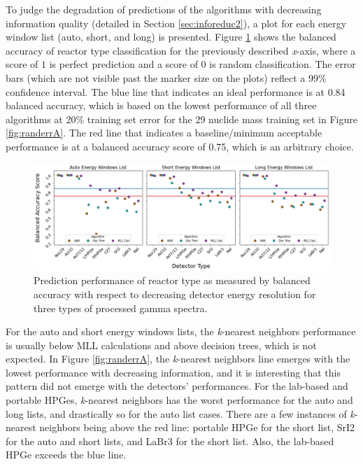 
To judge the degradation of predictions of the algorithms with decreasing
information quality (detailed in Section \ref{sec:inforeduc2}), a plot for each
energy window list (auto, short, and long) is presented.  Figure \ref{fig:rxtr}
shows the balanced accuracy of reactor type classification for the previously
described \textit{x}-axis, where a score of $1$ is perfect prediction and a
score of $0$ is random classification. The error bars (which are not visible
past the marker size on the plots) reflect a 99\% confidence interval.  The
blue line that indicates an ideal performance is at 0.84 balanced accuracy,
which is based on the lowest performance of all three algorithms at 20\%
training set error for the 29 nuclide mass training set in Figure
\ref{fig:randerrA}.  The red line that indicates a baseline/minimum acceptable
performance is at a balanced accuracy score of 0.75, which is an arbitrary
choice. 

\begin{figure}[!htb]
  \centering
  \includegraphics[width=\textwidth]{./chapters/exp2/detector_preds_wrt_enlist_BalAcc_rxtr.png}
  \caption{Prediction performance of reactor type as measured by balanced 
           accuracy with respect to decreasing detector energy resolution 
           for three types of processed gamma spectra.}
  \label{fig:rxtr}
\end{figure}

For the auto and short energy windows lists, the \textit{k}-nearest neighbors
performance is usually below \gls{MLL} calculations and above decision trees,
which is not expected. In Figure \ref{fig:randerrA}, the \textit{k}-nearest
neighbors line emerges with the lowest performance with decreasing information,
and it is interesting that this pattern did not emerge with the detectors'
performances. For the lab-based and portable \gls{HPGe}s, \textit{k}-nearest
neighbors has the worst performance for the auto and long lists, and
drastically so for the auto list cases. There are a few instances of
\textit{k}-nearest neighbors being above the red line: portable \gls{HPGe} for
the short list, \gls{SrI2} for the auto and short lists, and \gls{LaBr3} for
the short list. Also, the lab-based \gls{HPGe} exceeds the blue line.

